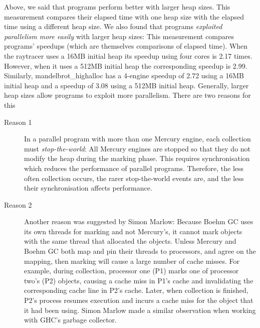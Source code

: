 Above, we said that programs perform better with larger heap sizes.
This measurement compares their elapsed time with one heap
size with the elapsed time using a different heap size.
We also found that programs \emph{exploited parallelism more easily} with
larger heap sizes:
This measurement compares programs' speedups (which are themselves
comparisons of elapsed time).
When the raytracer uses a 16MB initial heap its speedup using four
cores is 2.17 times.
However, when it uses a 512MB initial heap the corresponding speedup is
2.99.
Similarly,
mandelbrot\_highalloc has a 4-engine speedup of 2.72 using a 16MB initial
heap and a speedup of 3.08 using a 512MB initial heap.
Generally,
larger heap sizes allow programs to exploit more parallelism.
There are two reasons for this

\begin{description}

    \item[Reason 1]
    In a parallel program with more than one Mercury engine,
    each collection must \emph{stop-the-world}:
    All Mercury engines are stopped so that they do not modify the heap during
    the marking phase.
    This requires synchronisation which reduces the performance of parallel
    programs.
    Therefore, the less often collection occurs, the rarer stop-the-world
    events are, and the less their synchronisation affects performance.

    \item[Reason 2]
    Another reason was suggested by Simon Marlow:
    Because Boehm GC uses its own threads for marking and not Mercury's,
    it cannot mark objects with the same thread that allocated the objects.
    Unless Mercury and Boehm GC both map and pin their threads to
    processors,
    and agree on the mapping,
    then marking will cause a large number of cache misses.
    For example, during collection, processor one (P1) marks one of processor
    two's
    (P2) objects,
    causing a cache miss in P1's cache and invalidating the corresponding cache
    line in P2's cache.
    Later, when collection is finished,
    P2's process resumes execution and incurs a cache miss for the object that
    it had been using.
    Simon Marlow made a similar observation when working with GHC's garbage
    collector.

\end{description}

